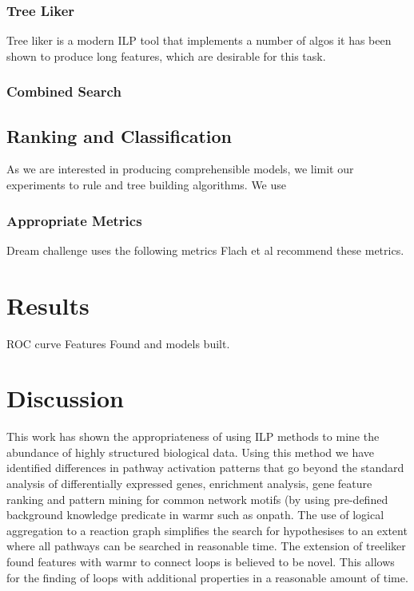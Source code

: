 \documentclass[•]{article}
\begin{document}
	     \subsubsection{Tree Liker}
	     Tree liker is a modern ILP tool that implements a number of algos
	     it has been shown to produce long features, which are desirable for 
	     this task.
	     \subsubsection{Combined Search}
	     
	     
	  \subsection{Ranking and Classification}
	  As we are interested in producing comprehensible models, we limit
	  our experiments to rule and tree building algorithms.
	  We use 
	     \subsubsection{Appropriate Metrics}
	     Dream challenge uses the following metrics
	     Flach et al recommend these metrics. 
	     
	\section{Results}
	ROC curve
	Features Found and models built.
	\section{Discussion}
	This work has shown the appropriateness of using ILP methods
	to mine the abundance of highly structured biological data.
	Using this method we have identified differences in pathway activation
	patterns that go beyond the standard analysis of differentially expressed
	genes, enrichment analysis, gene feature ranking and pattern mining for 
	common network motifs (by using pre-defined background knowledge 
	predicate in 	warmr such as onpath. The use of logical aggregation to a  
	reaction graph 
	simplifies the search for hypothesises to an extent where all pathways
	can be searched in reasonable time. 
	The extension of treeliker found features with warmr to connect loops is
	believed to be novel. This allows for the finding of loops with additional
	properties in a reasonable amount of time. 
\end{document}
